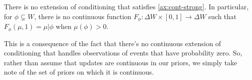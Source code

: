%
\begin{prop}
	There is no extension of conditioning that satisfies \cref{ax:cont-strong}.
	In particular, 
	for $\phi\subsetneq W$,
	there is no continuous function
	$F_\phi : \Delta W \times [0,1] \to \Delta W$
	such that $F_\phi(\mu, 1) = \mu|\phi$ when $\mu(\phi) > 0$. 
\end{prop}
This is a consequence of the fact that there's no 
continuous extension of conditioning that handles
observations of events that have probability zero.
%
So, rather than assume that updates are continuous in our priors, we
simply take note of the set of priors on which it is continuous.

